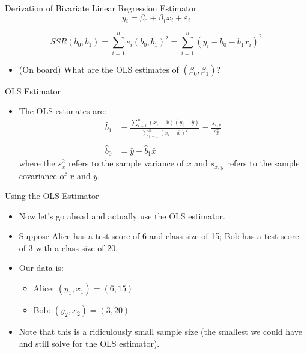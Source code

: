 \documentclass[aspectratio=169,11pt]{beamer}
\begin{document}


\begin{frame}{Derivation of Bivariate Linear Regression Estimator}
\[
	y_i = \beta_0 + \beta_1 x_i + \varepsilon_i
	\]

\[
		SSR\left(b_0,b_1\right) = \sum_{i=1}^{n} e_i \left(b_0,b_1\right)^2  =  \sum_{i=1}^{n} \left(y_i - b_{0} - b_{1} x_{i}\right)^{2} 
	\]


	\begin{itemize}
		\item (On board) What are the OLS estimates of $\left(\beta_0,\beta_1\right)$?
	\end{itemize}
\end{frame}

\begin{frame}{OLS Estimator}
	\begin{itemize}
\item The OLS estimates are:
\begin{align*}
\hat{b}_1 &=\frac{\sum\limits_{i=1}^n(x_i-\bar{x})(y_i-\bar{y})}{\sum\limits_{i=1}^n(x_i-\bar{x})^2}=\frac{s_{x,y}}{s_{x}^{2}} \\
\\
\hat{b}_0 & = \bar{y} - \hat{b}_1 \bar{x}
\end{align*}
where the $s_{x}^{2}$ refers to the sample variance of $x$ and $s_{x,y}$ refers to the sample covariance of $x$ and $y$.

	\end{itemize}
\end{frame}


\begin{frame}{Using the OLS Estimator}
\begin{itemize}
\item Now let's go ahead and actually use the OLS estimator.
\medskip
\item Suppose Alice has a test score of 6 and class size of 15; Bob has a test score of 3 with a class size of 20. 
\medskip
\item Our data is:
\begin{itemize}
\item Alice: $(y_1,x_1)=(6,15)$
\item Bob: $(y_2,x_2)=(3,20)$
\end{itemize}

\item Note that this is  a ridiculously small sample size (the smallest we could have and still solve for the OLS estimator). 
\end{itemize}
\end{frame}
\end{document}
